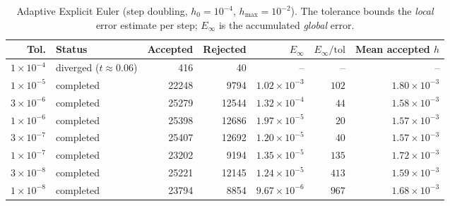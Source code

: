 \begin{table}[H]
\centering
\caption{Adaptive Explicit Euler (step doubling, $h_0=10^{-4}$, $h_{\max}=10^{-2}$). The tolerance bounds the \emph{local} error estimate per step; $E_\infty$ is the accumulated \emph{global} error.}
\label{tab:adaptive}
\small
\begin{tabular}{rlrrrrr}
\toprule
Tol. & Status & Accepted & Rejected & $E_\infty$ & $E_\infty/\mathrm{tol}$ & Mean accepted $h$\\
\midrule
$1\times10^{-4}$ & diverged ($t\approx0.06$) & 416 & 40 & -- & -- & --\\
$1\times10^{-5}$ & completed & 22248 & 9794 & $1.02\times10^{-3}$ & $102$ & $1.80\times10^{-3}$\\
$3\times10^{-6}$ & completed & 25279 & 12544 & $1.32\times10^{-4}$ & $44$ & $1.58\times10^{-3}$\\
$1\times10^{-6}$ & completed & 25398 & 12686 & $1.97\times10^{-5}$ & $20$ & $1.57\times10^{-3}$\\
$3\times10^{-7}$ & completed & 25407 & 12692 & $1.20\times10^{-5}$ & $40$ & $1.57\times10^{-3}$\\
$1\times10^{-7}$ & completed & 23202 & 9194 & $1.35\times10^{-5}$ & $135$ & $1.72\times10^{-3}$\\
$3\times10^{-8}$ & completed & 25221 & 12145 & $1.24\times10^{-5}$ & $413$ & $1.59\times10^{-3}$\\
$1\times10^{-8}$ & completed & 23794 & 8854 & $9.67\times10^{-6}$ & $967$ & $1.68\times10^{-3}$\\
\bottomrule
\end{tabular}
\end{table}

